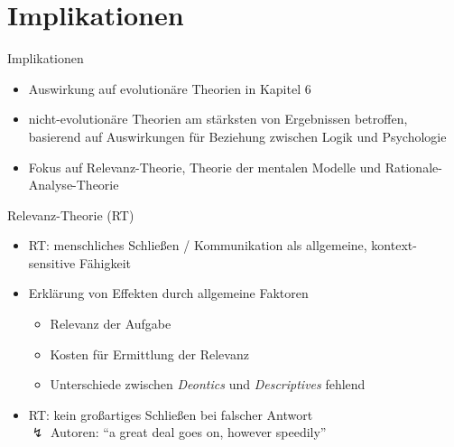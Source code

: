 
\section{Implikationen}

\begin{frame}{Implikationen {\scriptsize \cite[S.~112-113]{stenningHumanReasoningCognitive2008}}}
    \begin{itemize}
        \item Auswirkung auf evolutionäre Theorien  in Kapitel 6
        \item nicht-evolutionäre Theorien am stärksten von Ergebnissen betroffen,
            basierend auf Auswirkungen für Beziehung zwischen Logik und Psychologie
        \item Fokus auf Relevanz-Theorie, Theorie der mentalen Modelle und Rationale-Analyse-Theorie
    \end{itemize}
\end{frame}


\begin{frame}{Relevanz-Theorie (RT) {\scriptsize \cite[S.~113-114]{stenningHumanReasoningCognitive2008}}}
    \begin{itemize}
        \item RT: menschliches Schließen / Kommunikation als allgemeine, kontext-sensitive Fähigkeit
        \item Erklärung von Effekten durch allgemeine Faktoren
        \begin{itemize}
            \item Relevanz der Aufgabe
            \item Kosten für Ermittlung der Relevanz
            \item Unterschiede zwischen \emph{Deontics} und \emph{Descriptives} fehlend
        \end{itemize}
        \item RT: kein großartiges Schließen bei falscher Antwort \\
            $\lightning$ Autoren: \enquote{a great deal goes on, however speedily}
    \end{itemize}
\end{frame}


